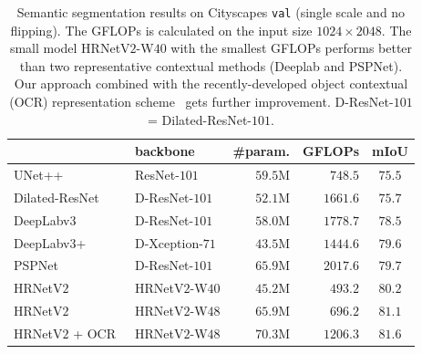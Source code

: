 \documentclass[10pt,journal,compsoc]{IEEEtran}
\begin{document}
\setlength{\tabcolsep}{5.5pt}
	\begin{table}[t]
		\scriptsize
		\centering
		\caption{Semantic segmentation results on 
		Cityscapes \texttt{val}
	    (single scale and no flipping). 
		The GFLOPs is calculated on the input size $1024 \times 2048$.
		{The small model HRNetV$2$-W$40$
		with the smallest GFLOPs
		performs better than 
		two representative contextual methods (Deeplab and PSPNet).
		Our approach combined with 
		the recently-developed object contextual
		(OCR) representation scheme~\cite{YuanCW18} 
		gets further improvement.}
		D-ResNet-$101$ = Dilated-ResNet-$101$.
		}
		\label{tab:cityscapevalresults}
		\vspace{-3mm}
		\begin{tabular}{l|lrr|c}
			\hline%
			 & backbone & \#param. & GFLOPs & mIoU\\
			 \hline
			 
			 \hline
			UNet++~\cite{ZhouSTL18} & ResNet-$101$ & $59.5$M & $748.5$ & $75.5$ \\
			Dilated-ResNet~\cite{HeZRS16} & D-ResNet-$101$ & $52.1$M & $1661.6$ & $75.7$ \\
			DeepLabv3~\cite{ChenPSA17} & D-ResNet-$101$ & $58.0$M & $1778.7$ & $78.5$ \\
			DeepLabv3+~\cite{ChenZPSA18} & D-Xception-$71$ & $43.5$M & $1444.6$ & $79.6$ \\
			PSPNet~\cite{ZhaoSQWJ17} & D-ResNet-$101$ & $65.9$M & $2017.6$ & $79.7$ \\
			\hline
			HRNetV$2$ &  HRNetV$2$-W$40$ & $45.2$M & $493.2$ & $80.2$ \\
			HRNetV$2$ & HRNetV$2$-W$48$ & $65.9$M & $696.2$ & $81.1$ \\
			HRNetV$2$ + OCR~\cite{YuanCW18}& HRNetV$2$-W$48$ & $70.3$M & $1206.3$ & $\mathbf{81.6}$ \\
			\hline
		\end{tabular}
		\vspace{-.2cm}
	\end{table}
	
\end{document}
